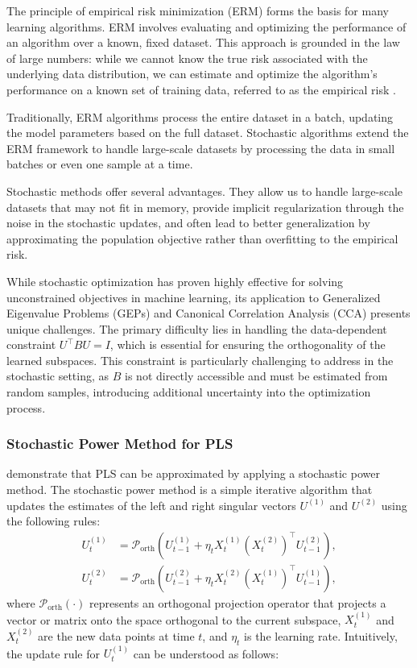 The principle of empirical risk minimization (ERM) forms the basis for many learning algorithms. ERM involves evaluating and optimizing the performance of an algorithm over a known, fixed dataset. This approach is grounded in the law of large numbers: while we cannot know the true risk associated with the underlying data distribution, we can estimate and optimize the algorithm's performance on a known set of training data, referred to as the empirical risk \citep{vapnik1999nature}.

Traditionally, ERM algorithms process the entire dataset in a batch, updating the model parameters based on the full dataset. Stochastic algorithms extend the ERM framework to handle large-scale datasets by processing the data in small batches or even one sample at a time. 

Stochastic methods offer several advantages. They allow us to handle large-scale datasets that may not fit in memory, provide implicit regularization through the noise in the stochastic updates, and often lead to better generalization by approximating the population objective rather than overfitting to the empirical risk.

While stochastic optimization has proven highly effective for solving unconstrained objectives in machine learning, its application to Generalized Eigenvalue Problems (GEPs) and Canonical Correlation Analysis (CCA) presents unique challenges. The primary difficulty lies in handling the data-dependent constraint $U^\top B U = I$, which is essential for ensuring the orthogonality of the learned subspaces. This constraint is particularly challenging to address in the stochastic setting, as $B$ is not directly accessible and must be estimated from random samples, introducing additional uncertainty into the optimization process.

\subsubsection{Stochastic Power Method for PLS}
\citet{arora2016stochastic} demonstrate that PLS can be approximated by applying a stochastic power method. The stochastic power method is a simple iterative algorithm that updates the estimates of the left and right singular vectors $U^{(1)}$ and $U^{(2)}$ using the following rules:
\begin{align*}
U^{(1)}_t &= \mathcal{P}_{\text{orth}} \left( U^{(1)}_{t-1} + \eta_t X_t^{(1)} (X_t^{(2)})^\top U^{(2)}_{t-1} \right), \\
U^{(2)}_t &= \mathcal{P}_{\text{orth}} \left( U^{(2)}_{t-1} + \eta_t X_t^{(2)} (X_t^{(1)})^\top U^{(1)}_{t-1} \right),
\end{align*}
where $\mathcal{P}_{\text{orth}}(\cdot)$ represents an orthogonal projection operator that projects a vector or matrix onto the space orthogonal to the current subspace, $X_t^{(1)}$ and $X_t^{(2)}$ are the new data points at time $t$, and $\eta_t$ is the learning rate.
Intuitively, the update rule for $U^{(1)}_t$ can be understood as follows:


